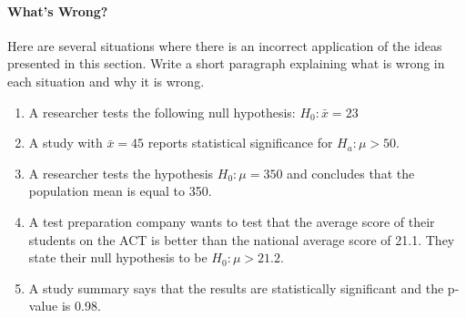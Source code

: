 \documentclass[10pt]{article}\usepackage[]{graphicx}\usepackage[]{color}
\begin{document}
\clearpage
\paragraph{What's Wrong?}

Here are several situations where there is an incorrect application of the ideas presented in this section. Write a short paragraph explaining what is wrong in each situation and why it is wrong. 

\begin{enumerate}
  \itemsep0.5in
  \item A researcher tests the following null hypothesis: $H_0 : \bar{x} = 23$
  \item A study with $\bar{x} = 45$ reports statistical significance for $H_a : \mu > 50$. 
  \item A researcher tests the hypothesis $H_0 : \mu = 350$ and concludes that the population mean is equal to 350. 
  \item A test preparation company wants to test that the average score of their students on the ACT is better than the national average score of 21.1. They state their null hypothesis to be $H_0 : \mu > 21.2$. 
  \item A study summary says that the results are statistically significant and the p-value is 0.98. 
\end{enumerate}
% 
% 
% 
% 
% 
\end{document}
